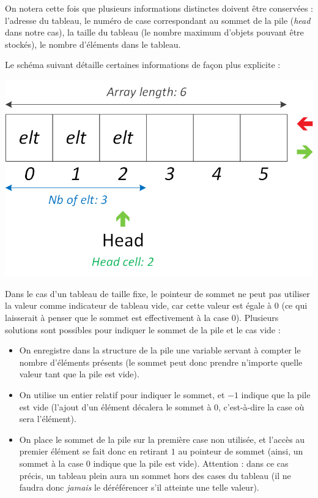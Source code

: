 \documentclass[11pt,a4paper]{article}
\begin{document}
\smallskip

On notera cette fois que plusieurs informations distinctes doivent être conservées : l'adresse du tableau, le numéro de case correspondant au sommet de la pile (\textit{head} dans notre cas), la taille du tableau (le nombre maximum d'objets pouvant être stockés), le nombre d'éléments dans le tableau.

Le schéma suivant détaille certaines informations de façon plus explicite :\\

\begin{center}
\includegraphics[scale=1]{img/piles/Piles_5_Tableau_Statique_Structure_Detaillee.png}
\end{center}

\smallskip

Dans le cas d'un tableau de taille fixe, le pointeur de sommet ne peut pas utiliser la valeur  comme indicateur de tableau vide, car cette valeur est égale à $ 0 $ (ce qui laisserait à penser que le sommet est effectivement à la case 0).
Plusieurs solutions sont possibles pour indiquer le sommet de la pile et le cas vide :

\begin{itemize}
\item On enregistre dans la structure de la pile une variable servant à compter le nombre d'éléments présents (le sommet peut donc prendre n'importe quelle valeur tant que la pile est vide).
\item On utilise un entier relatif pour indiquer le sommet, et $ -1 $ indique que la pile est vide (l'ajout d'un élément décalera le sommet à $ 0 $, c'est-à-dire la case où sera l'élément).
\item On place le sommet de la pile sur la première case non utilisée, et l'accès au premier élément se fait donc en retirant $ 1 $ au pointeur de sommet (ainsi, un sommet à la case $ 0 $ indique que la pile est vide).
Attention : dans ce cas précis, un tableau plein aura un sommet hors des cases du tableau (il ne faudra donc \textit{jamais} le déréférencer s'il atteinte une telle valeur).
\end{itemize}
\end{document}
